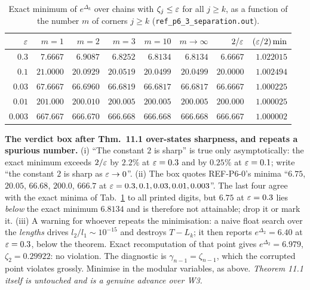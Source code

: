 \documentclass[11pt]{article}
\theoremstyle{definition}\newtheorem{example}[theorem]{Example}
\begin{document}
\begin{table}[h]\centering\small
\caption{Exact minimum of $e^{\Delta_k}$ over chains with $\zeta_j\le\varepsilon$ for all $j\ge k$,
as a function of the number $m$ of corners $j\ge k$ (\texttt{ref\_p6\_3\_separation.out}).}
\label{tab:sharp}
\begin{tabular}{@{}rrrrrrrr@{}}
\toprule
$\varepsilon$ & $m=1$ & $m=2$ & $m=3$ & $m=10$ & $m\to\infty$ & $2/\varepsilon$ & $(\varepsilon/2)\min$\\
\midrule
$0.3$   & $7.6667$  & $6.9087$  & $6.8252$  & $6.8134$  & $6.8134$  & $6.6667$  & $1.022015$\\
$0.1$   & $21.0000$ & $20.0929$ & $20.0519$ & $20.0499$ & $20.0499$ & $20.0000$ & $1.002494$\\
$0.03$  & $67.6667$ & $66.6960$ & $66.6819$ & $66.6817$ & $66.6817$ & $66.6667$ & $1.000225$\\
$0.01$  & $201.000$ & $200.010$ & $200.005$ & $200.005$ & $200.005$ & $200.000$ & $1.000025$\\
$0.003$ & $667.667$ & $666.670$ & $666.668$ & $666.668$ & $666.668$ & $666.667$ & $1.000002$\\
\bottomrule
\end{tabular}
\end{table}

\begin{verdictgap}
\textbf{The verdict box after Thm.~11.1 over-states sharpness, and repeats a spurious
number.}  (i) ``The constant $2$ is sharp'' is true only asymptotically: the exact minimum
exceeds $2/\varepsilon$ by $2.2\%$ at $\varepsilon=0.3$ and by $0.25\%$ at $\varepsilon=0.1$; write ``the
constant $2$ is sharp as $\varepsilon\to0$''.  (ii) The box quotes REF-P6-0's minima
``$6.75$, $20.05$, $66.68$, $200.0$, $666.7$ at $\varepsilon=0.3,0.1,0.03,0.01,0.003$''.  The
last four agree with the exact minima of Tab.~\ref{tab:sharp} to all printed digits, but
$6.75$ at $\varepsilon=0.3$ lies \emph{below} the exact minimum $6.8134$ and is therefore not
attainable; drop it or mark it.  (iii) A warning for whoever repeats the minimisation: a
naive float search over the \emph{lengths} drives $l_2/l_1\sim10^{-15}$ and destroys
$T-L_k$; it then reports $e^{\Delta_2}=6.40$ at $\varepsilon=0.3$, below the theorem.  Exact
recomputation of that point gives $e^{\Delta_2}=6.979$, $\zeta_2=0.29922$: no violation.
The diagnostic is $\gamma_{n-1}=\zeta_{n-1}$, which the corrupted point violates
grossly.  Minimise in the modular variables, as above.  \emph{Theorem 11.1 itself is
untouched and is a genuine advance over W3.}
\end{verdictgap}
\end{document}
